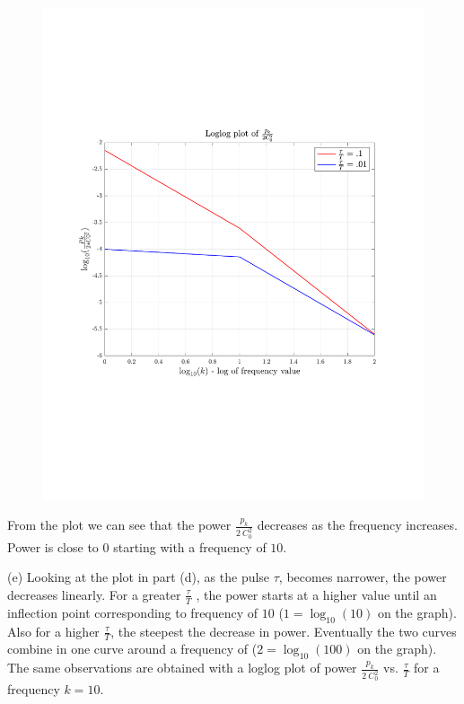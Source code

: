 \documentclass[12pt,twoside]{article}
\begin{document}
\begin{figure}[!h]
 \centering
 \includegraphics[scale=0.5]{power_vs_tau_T}
\end{figure}
From the plot we can see that the power $\frac{p_k}{2 ~ C_0^2}$ decreases as the frequency increases.
Power is close to $0$ starting with a frequency of $10$.

\item [(e)]
Looking at the plot in part (d), as the pulse $\tau$, becomes narrower, the power decreases linearly.
For a greater  $\frac{\tau}{T}$ , the power starts at a higher value  until an inflection point corresponding to frequency of $10$ ($1 = \log_{10}(10)$ on the graph).
Also for a higher $\frac{\tau}{T}$, the steepest the decrease in power. Eventually the two curves combine in one curve around
a frequency of ($2 = \log_{10}(100)$ on the graph).
The same observations are obtained with a loglog plot  of power  $\frac{p_k}{2 ~ C_0^2}$ vs.  $\frac{\tau}{T}$ for a frequency $k=10$.
\end{document}
